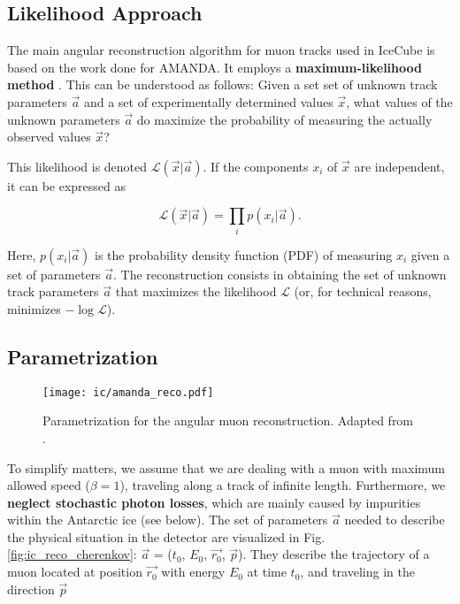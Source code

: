 \subsection{Likelihood Approach}
The main angular reconstruction algorithm for muon tracks used in IceCube is based on the work done for AMANDA. It employs a \textbf{maximum-likelihood method} . This can be understood as follows: Given a set set of unknown track parameters $\vec{a}$ and a set of experimentally determined values $\vec{x}$, what values of the unknown parameters $\vec{a}$ do maximize the probability of measuring the actually observed values $\vec{x}$?

This likelihood is denoted $\mathcal{L}(\vec{x}|\vec{a})$. If the components $x_i$ of $\vec{x}$ are independent, it can be expressed as

\begin{equation}
\mathcal{L}(\vec{x}|\vec{a}) = \prod_i p(x_i|\vec{a}).
\end{equation}

Here, $p(x_i|\vec{a})$ is the probability density function (PDF) of measuring $x_i$ given a set of parameters $\vec{a}$. The reconstruction consists in obtaining the set of unknown track parameters $\vec{a}$ that maximizes the likelihood $\mathcal{L}$ (or, for technical reasons, minimizes $-\log{\mathcal{L}}$).

\subsection{Parametrization}
\begin{figure}[htb]
    \texttt{[image: ic/amanda\_reco.pdf]}
    \caption[Angular reconstruction in IceCube]{Parametrization for the angular muon reconstruction. Adapted from \cite{Ahrens2004}.}
\end{figure}

To simplify matters, we assume that we are dealing with a muon with maximum allowed speed ($\beta=1$), traveling along a track of infinite length. Furthermore, we \textbf{neglect stochastic photon losses}, which are mainly caused by impurities within the Antarctic ice (see below). The set of parameters $\vec{a}$ needed to describe the physical situation in the detector are visualized in Fig. \ref{fig:ic_reco_cherenkov}: $\vec{a}$ = ($t_0$, $E_0$, $\vec{r_0}$, $\vec{p}$). They describe the trajectory of a muon located at position $\vec{r_0}$ with energy $E_0$ at time $t_0$, and traveling in the direction $\vec{p}$

